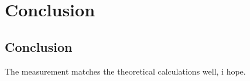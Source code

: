 \chapter{Conclusion}\label{chap:conclusion}

\vspace{-5pt}
\section{Conclusion}\label{sec:concld}


The measurement matches the theoretical calculations well, i hope.


